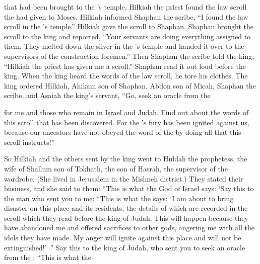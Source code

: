 {that had been brought
to the
{}’s
temple,
Hilkiah
the priest
found
the law
scroll
the {}
had given
to Moses.
Hilkiah
informed
Shaphan
the scribe,
“I found
the law
scroll
in the
{}’s
temple.”
Hilkiah
gave
the scroll
to
Shaphan.
Shaphan
brought
the scroll
to
the king
and reported, “Your servants
are
doing
everything
assigned to them.
They melted
down the silver
in the
{}’s
temple
and handed it
over
to the supervisors
of the construction
foremen.”
Then Shaphan
the scribe
told the king,
“Hilkiah
the priest
has given
me a scroll.”
Shaphan
read
it out loud before
the king.
When
the king
heard
the words
of the law
scroll, he tore
his clothes.
The king
ordered
Hilkiah,
Ahikam
son
of Shaphan,
Abdon
son
of Micah,
Shaphan
the scribe,
and Asaiah
the king’s
servant,
“Go,
seek
an oracle from the

{}
for
me
and those who remain
in Israel
and Judah.
Find out
about the words
of this scroll
that
has been discovered.
For
the
{}’s
fury
has
been ignited
against us, because
our ancestors
have
not
obeyed
the
word
of the {}
by doing
all
that this
scroll
instructs!”
\par }{\PP {}So Hilkiah
and the others sent by the king
went
to Huldah
the prophetess,
the wife
of Shallum
son
of Tokhath,
the son
of Hasrah,
the supervisor
of the wardrobe.
(She lived in
Jerusalem
in the Mishneh district.) They stated their business,
and she said
to them: “This is what
the {}
God
of Israel
says: ‘Say
this to the man
who
sent
you to me:
“This is what
the {}
says: ‘I am
about to bring
disaster
on
this
place
and its residents,
the details
of which are recorded
in the scroll
which
they read
before
the king
of Judah.
This will happen because
they have abandoned
me and offered sacrifices
to other
gods,
angering
me with all
the idols
they have made.
My anger
will ignite
against this
place
and will not be extinguished!’ ”
Say
this
to
the king
of Judah,
who sent
you to seek
an oracle from the
{}: “This is what
the

}
